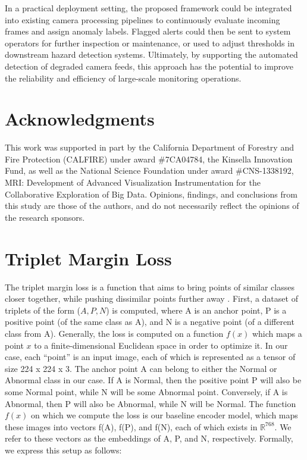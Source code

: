 \documentclass{article}
\begin{document}
In a practical deployment setting, the proposed framework could be integrated into existing camera processing pipelines to continuously evaluate incoming frames and assign anomaly labels. Flagged alerts could then be sent to system operators for further inspection or maintenance, or used to adjust thresholds in downstream hazard detection systems. Ultimately, by supporting the automated detection of degraded camera feeds, this approach has the potential to improve the reliability and efficiency of large-scale monitoring operations.

\section{Acknowledgments}
This work was supported in part by the California Department of Forestry and Fire Protection (CALFIRE) under award \#7CA04784, the Kinsella Innovation Fund, as well as the National Science Foundation under award \#CNS-1338192, MRI: Development of Advanced Visualization Instrumentation for the Collaborative Exploration of Big Data. Opinions, findings, and conclusions from this study are those of the authors, and do not necessarily reflect the opinions of the research sponsors.

\printbibliography

\appendix
\section{Triplet Margin Loss}
\label{app:marginloss}
The triplet margin loss is a function that aims to bring points of similar classes closer together, while pushing dissimilar points further away \cite{Schroff_2015_CVPR}. First, a dataset of triplets of the form ($A, P, N$) is computed, where A is an anchor point, P is a positive point (of the same class as A), and N is a negative point (of a different class from A). Generally, the loss is computed on a function $f(x)$ which maps a point $x$ to a finite-dimensional Euclidean space in order to optimize it. In our case, each “point” is an input image, each of which is represented as a tensor of size 224 x 224 x 3. The anchor point A can belong to either the Normal or Abnormal class in our case. If A is Normal, then the positive point P will also be some Normal point, while N will be some Abnormal point. Conversely, if A is Abnormal, then P will also be Abnormal, while N will be Normal. The function $f(x)$ on which we compute the loss is our baseline encoder model, which maps these images into vectors f(A), f(P), and f(N), each of which exists in $\mathbb{R}^{768}$. We refer to these vectors as the embeddings of A, P, and N, respectively. Formally, we express this setup as follows:
\end{document}
